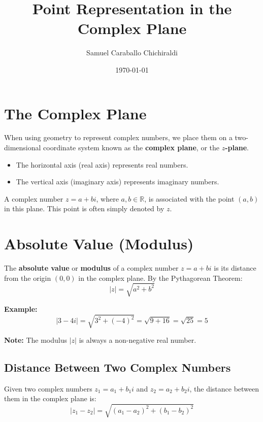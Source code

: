 \documentclass{article}
\title{Point Representation in the Complex Plane}
\author{Samuel Caraballo Chichiraldi}
\date{\today}
\begin{document}
\maketitle

\section*{The Complex Plane}

When using geometry to represent complex numbers, we place them on a two-dimensional coordinate system known as the \textbf{complex plane}, or the \textbf{$z$-plane}.

\begin{itemize}
    \item The horizontal axis (real axis) represents real numbers.
    \item The vertical axis (imaginary axis) represents imaginary numbers.
\end{itemize}

A complex number \( z = a + bi \), where \( a, b \in \mathbb{R} \), is associated with the point \( (a, b) \) in this plane. This point is often simply denoted by \( z \).

\section*{Absolute Value (Modulus)}

The \textbf{absolute value} or \textbf{modulus} of a complex number \( z = a + bi \) is its distance from the origin \( (0, 0) \) in the complex plane. By the Pythagorean Theorem:
\begin{equation}
|z| = \sqrt{a^2 + b^2}
\label{eq:modulus}
\end{equation}

\textbf{Example:}
\[
|3 - 4i| = \sqrt{3^2 + (-4)^2} = \sqrt{9 + 16} = \sqrt{25} = 5
\]

\textbf{Note:} The modulus \( |z| \) is always a non-negative real number.

\subsection*{Distance Between Two Complex Numbers}

Given two complex numbers \( z_1 = a_1 + b_1i \) and \( z_2 = a_2 + b_2i \), the distance between them in the complex plane is:
\begin{equation}
|z_1 - z_2| = \sqrt{(a_1 - a_2)^2 + (b_1 - b_2)^2}
\label{eq:distance}
\end{equation}
\end{document}
